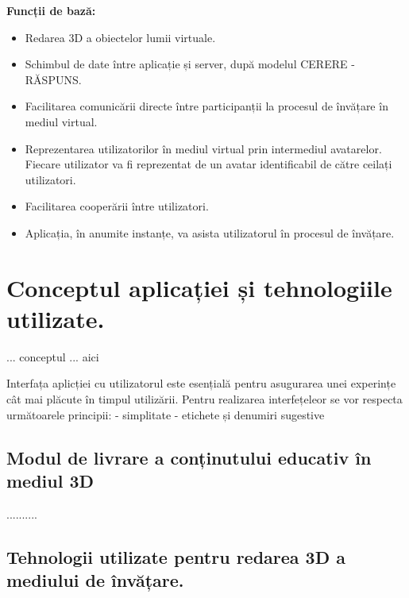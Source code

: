 \textbf{Funcții de bază:}
\begin{itemize}
\item Redarea 3D a obiectelor lumii virtuale.
\item Schimbul de date între aplicație și server, după modelul CERERE - RĂSPUNS.
\item Facilitarea comunicării directe între participanții la procesul de învățare în mediul virtual.
\item Reprezentarea utilizatorilor în mediul virtual prin intermediul avatarelor. Fiecare utilizator va fi reprezentat de un avatar identificabil de către ceilați utilizatori.
\item Facilitarea cooperării între utilizatori.
\item Aplicația, în anumite instanțe, va asista utilizatorul în procesul de învățare. 
\end{itemize}

\section{Conceptul aplicației și tehnologiile utilizate.}
... conceptul ... aici
\par Interfața aplicției cu utilizatorul este esențială pentru asugurarea unei experințe cât mai plăcute în timpul utilizării. Pentru realizarea interfețeleor se vor respecta următoarele principii:
- simplitate
- etichete și denumiri sugestive

\newpage
\subsection{Modul de livrare a conținutului educativ în mediul 3D}

..........

\newpage

\subsection{Tehnologii utilizate pentru redarea 3D a mediului de învățare.}

